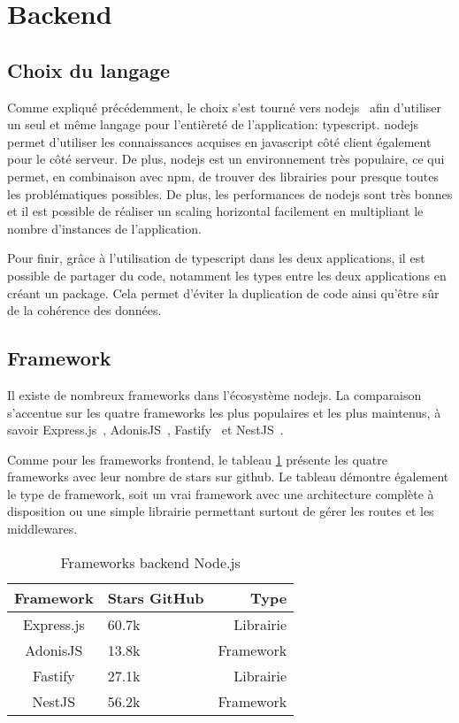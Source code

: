 \section{Backend}

\subsection{Choix du langage}

Comme expliqué précédemment, le choix s'est tourné vers \gls{nodejs}~\cite{nodejs} afin d'utiliser un seul et même langage pour l'entièreté de l'application: \gls{typescript}. \gls{nodejs} permet d'utiliser les connaissances acquises en \gls{javascript} côté client également pour le côté serveur. De plus, \gls{nodejs} est un environnement très populaire, ce qui permet, en combinaison avec \gls{npm}, de trouver des librairies pour presque toutes les problématiques possibles. De plus, les performances de \gls{nodejs} sont très bonnes et il est possible de réaliser un scaling horizontal facilement en multipliant le nombre d'instances de l'application.

Pour finir, grâce à l'utilisation de \gls{typescript} dans les deux applications, il est possible de partager du code, notamment les types entre les deux applications en créant un package. Cela permet d'éviter la duplication de code ainsi qu'être sûr de la cohérence des données.

\subsection{Framework}

Il existe de nombreux frameworks dans l'écosystème \gls{nodejs}. La comparaison s'accentue sur les quatre frameworks les plus populaires et les plus maintenus, à savoir Express.js~\cite{expressjs}, AdonisJS~\cite{adonisjs}, Fastify~\cite{fastify} et NestJS~\cite{nestjs}.

Comme pour les frameworks frontend, le tableau \ref{tab:frameworks-backend-nodejs} présente les quatre frameworks avec leur nombre de stars sur \gls{github}. Le tableau démontre également le type de framework, soit un vrai framework avec une architecture complète à disposition ou une simple librairie permettant surtout de gérer les routes et les middlewares.

\begin{table}[h]
  \begin{center}
    \caption{Frameworks backend Node.js}
    \label{tab:frameworks-backend-nodejs}
    \begin{tabular}{c|l|r}
      Framework  & Stars GitHub & Type      \\ \hline
      Express.js & 60.7k        & Librairie \\
      AdonisJS   & 13.8k        & Framework \\
      Fastify    & 27.1k        & Librairie \\
      NestJS     & 56.2k        & Framework \\
    \end{tabular}
  \end{center}
\end{table}


